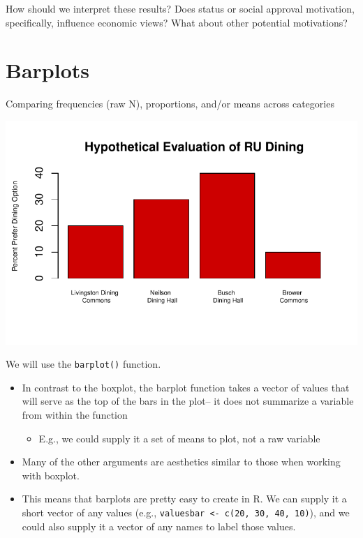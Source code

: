 \documentclass[
  letterpaper,
  DIV=11,
  numbers=noendperiod]{scrreprt}
\providecommand{\tightlist}{%
  \setlength{\itemsep}{0pt}\setlength{\parskip}{0pt}}\usepackage{longtable,booktabs,array}
\begin{document}
How should we interpret these results? Does status or social approval
motivation, specifically, influence economic views? What about other
potential motivations?

\hypertarget{barplots}{%
\section{Barplots}\label{barplots}}

Comparing frequencies (raw N), proportions, and/or means across
categories

\includegraphics{04-Visualization_files/figure-pdf/unnamed-chunk-6-1.pdf}

We will use the \texttt{barplot()} function.

\begin{itemize}
\tightlist
\item
  In contrast to the boxplot, the barplot function takes a vector of
  values that will serve as the top of the bars in the plot-- it does
  not summarize a variable from within the function

  \begin{itemize}
  \tightlist
  \item
    E.g., we could supply it a set of means to plot, not a raw variable
  \end{itemize}
\item
  Many of the other arguments are aesthetics similar to those when
  working with boxplot.
\item
  This means that barplots are pretty easy to create in R. We can supply
  it a short vector of any values (e.g.,
  \texttt{valuesbar\ \textless{}-\ c(20,\ 30,\ 40,\ 10)}), and we could
  also supply it a vector of any names to label those values.
\end{itemize}
\end{document}
